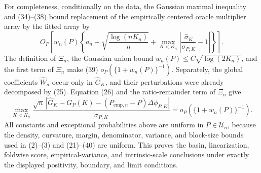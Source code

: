 For completeness, conditionally on the data, the Gaussian maximal inequality and (34)--(38) bound replacement of the empirically centered oracle multiplier array by the fitted array by
\[
 O_P\!\left[w_n(P)\left\{a_n+\sqrt{\frac{\log(nK_n)}n}
 +\max_{K<K_n}\left|\frac{\widehat\sigma_K}{\sigma_{P,K}}-1\right|\right\}\right]. \tag{39}
\]
The definition of \(\Xi_n\), the Gaussian union bound \(w_n(P)\leq C\sqrt{\log(2K_n)}\), and the first term of \(\Xi_n\) make (39) \(o_P(\{1+w_n(P)\}^{-1})\).  Separately, the global coefficients \(\widehat W_a\) occur only in \(\widehat G_K\), and their perturbations were already decomposed by (25).  Equation (26) and the ratio-remainder term of \(\Xi_n\) give
\[
 \max_{K<K_n}
 \frac{\sqrt n\,|\widehat G_K-G_P(K)-(P_{\mathrm{emp},n}-P)\Delta\phi_{P,K}|}
 {\sigma_{P,K}}
 =o_P\!\left(\{1+w_n(P)\}^{-1}\right).                                    \tag{40}
\]
All constants and exceptional probabilities above are uniform in \(P\in\mathcal U_n\), because the density, curvature, margin, denominator, variance, and block-size bounds used in (2)--(3) and (21)--(40) are uniform.  This proves the basin, linearization, foldwise score, empirical-variance, and intrinsic-scale conclusions under exactly the displayed positivity, boundary, and limit conditions.